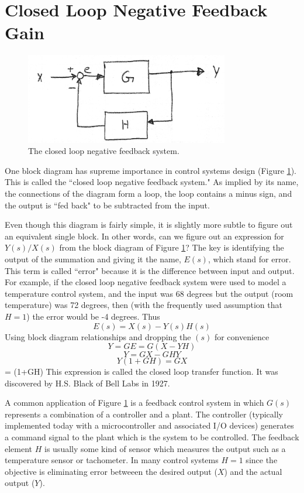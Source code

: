 \section{Closed Loop Negative Feedback Gain}

\begin{figure}\centering
\includegraphics[width=3.5in]{figs06/00769a.png}
\caption{The closed loop negative feedback system.}\label{closedloopnegfeedbackblockdiag}
\end{figure}

One block diagram has supreme importance in control systems design (Figure \ref{closedloopnegfeedbackblockdiag}).  This is called the ``closed loop negative feedback system."   As implied by its name, the connections of the diagram form a loop, the loop contains a minus sign, and the output is ``fed back" to be subtracted from the input.

Even though this diagram is fairly simple, it is slightly more subtle to figure out an equivalent single block.  In other words, can we figure out an expression for $Y(s)/X(s)$ from the block diagram of Figure \ref{closedloopnegfeedbackblockdiag}?
The key is identifying the output of the summation and giving it the name, $E(s)$, which stand for error.  This term is called ``error" because it is the difference between input and output.  For example, if the closed loop negative feedback system were used to model a temperature control system, and the input was 68 degrees but the output (room temperature) was 72 degrees, then (with the frequently used assumption that $H=1$) the error would be -4 degrees.  Thus
\[
E(s) = X(s)-Y(s)H(s)
\]
Using block diagram relationships and dropping the $(s)$ for convenience
\[
Y = GE = G(X-YH)
\]
\[
Y = GX-GHY
\]
\[
Y(1+GH) = GX
\]
\bq\label{hsblackeqn}
 =  {(1+GH)}
\eq
This expression is called the closed loop transfer function.  It was discovered by H.S. Black of Bell Labs in 1927.

A common application of Figure \ref{closedloopnegfeedbackblockdiag} is a feedback control system in which $G(s)$ represents a combination of a controller and a plant.  The controller (typically implemented today with a microcontroller and associated I/O devices) generates a command signal to the plant which is the system to be controlled.  The feedback element $H$ is usually some kind of sensor which measures the output such as a temperature sensor or tachometer.  In many control systems $H=1$ since the objective is eliminating error betweeen the desired output ($X$) and the actual output ($Y$).


